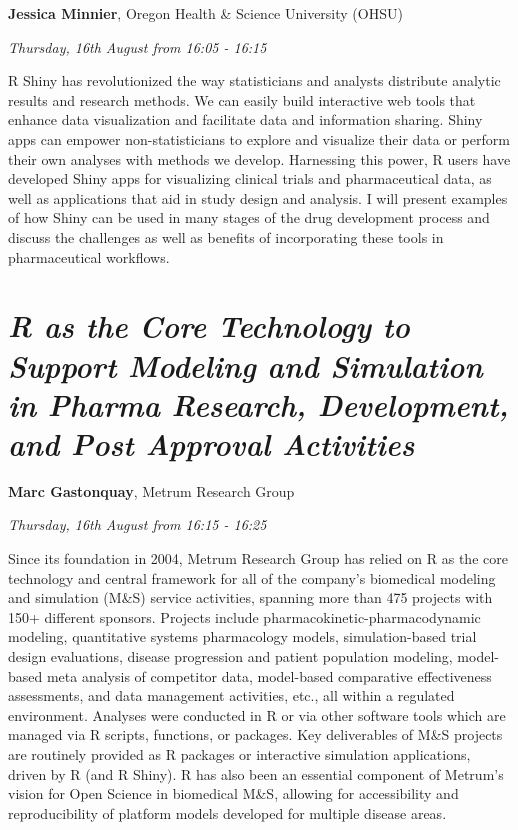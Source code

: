 \documentclass[]{book}
\theoremstyle{definition}
\theoremstyle{definition}
\theoremstyle{definition}
\theoremstyle{remark}
\begin{document}
\textbf{Jessica Minnier}, Oregon Health \& Science University (OHSU)

\emph{Thursday, 16th August from 16:05 - 16:15}

R Shiny has revolutionized the way statisticians and analysts distribute
analytic results and research methods. We can easily build interactive
web tools that enhance data visualization and facilitate data and
information sharing. Shiny apps can empower non-statisticians to explore
and visualize their data or perform their own analyses with methods we
develop. Harnessing this power, R users have developed Shiny apps for
visualizing clinical trials and pharmaceutical data, as well as
applications that aid in study design and analysis. I will present
examples of how Shiny can be used in many stages of the drug development
process and discuss the challenges as well as benefits of incorporating
these tools in pharmaceutical workflows.

\hypertarget{r-as-the-core-technology-to-support-modeling-and-simulation-in-pharma-research-development-and-post-approval-activities-1}{%
\section{\texorpdfstring{\emph{R as the Core Technology to Support
Modeling and Simulation in Pharma Research, Development, and Post
Approval
Activities}}{R as the Core Technology to Support Modeling and Simulation in Pharma Research, Development, and Post Approval Activities}}\label{r-as-the-core-technology-to-support-modeling-and-simulation-in-pharma-research-development-and-post-approval-activities-1}}

\textbf{Marc Gastonquay}, Metrum Research Group

\emph{Thursday, 16th August from 16:15 - 16:25}

Since its foundation in 2004, Metrum Research Group has relied on R as
the core technology and central framework for all of the company's
biomedical modeling and simulation (M\&S) service activities, spanning
more than 475 projects with 150+ different sponsors. Projects include
pharmacokinetic-pharmacodynamic modeling, quantitative systems
pharmacology models, simulation-based trial design evaluations, disease
progression and patient population modeling, model-based meta analysis
of competitor data, model-based comparative effectiveness assessments,
and data management activities, etc., all within a regulated
environment. Analyses were conducted in R or via other software tools
which are managed via R scripts, functions, or packages. Key
deliverables of M\&S projects are routinely provided as R packages or
interactive simulation applications, driven by R (and R Shiny). R has
also been an essential component of Metrum's vision for Open Science in
biomedical M\&S, allowing for accessibility and reproducibility of
platform models developed for multiple disease areas.
\end{document}
